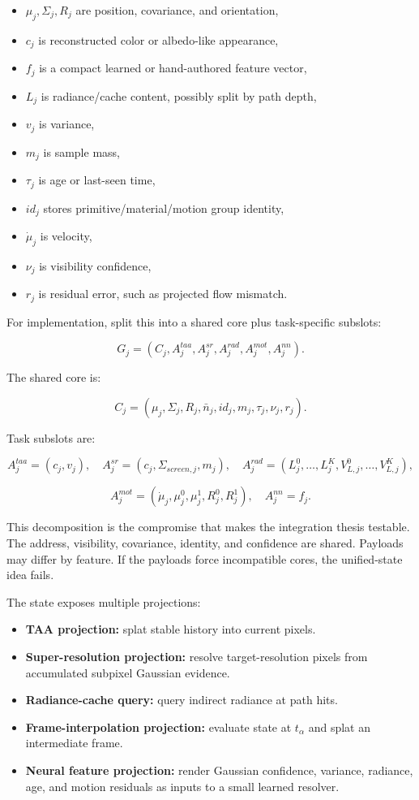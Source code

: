 \documentclass[11pt]{article}
\begin{document}
\begin{itemize}
  \item $\mu_j, \Sigma_j, R_j$ are position, covariance, and orientation,
  \item $c_j$ is reconstructed color or albedo-like appearance,
  \item $f_j$ is a compact learned or hand-authored feature vector,
  \item $L_j$ is radiance/cache content, possibly split by path depth,
  \item $v_j$ is variance,
  \item $m_j$ is sample mass,
  \item $\tau_j$ is age or last-seen time,
  \item $id_j$ stores primitive/material/motion group identity,
  \item $\dot{\mu}_j$ is velocity,
  \item $\nu_j$ is visibility confidence,
  \item $r_j$ is residual error, such as projected flow mismatch.
\end{itemize}

For implementation, split this into a shared core plus task-specific subslots:

\[
  G_j = (C_j, A_j^{taa}, A_j^{sr}, A_j^{rad}, A_j^{mot}, A_j^{nn}).
\]

The shared core is:

\[
  C_j = (\mu_j,\Sigma_j,R_j,\bar{n}_j,id_j,m_j,\tau_j,\nu_j,r_j).
\]

Task subslots are:

\[
  A_j^{taa}=(c_j,v_j),\quad
  A_j^{sr}=(c_j,\Sigma_{screen,j},m_j),\quad
  A_j^{rad}=(L_j^0,\ldots,L_j^K,V_{L,j}^0,\ldots,V_{L,j}^K),
\]

\[
  A_j^{mot}=(\dot{\mu}_j,\mu_j^0,\mu_j^1,R_j^0,R_j^1),
  \quad
  A_j^{nn}=f_j.
\]

This decomposition is the compromise that makes the integration thesis
testable. The address, visibility, covariance, identity, and confidence are
shared. Payloads may differ by feature. If the payloads force incompatible
cores, the unified-state idea fails.

The state exposes multiple projections:

\begin{itemize}
  \item \textbf{TAA projection:} splat stable history into current pixels.
  \item \textbf{Super-resolution projection:} resolve target-resolution pixels
        from accumulated subpixel Gaussian evidence.
  \item \textbf{Radiance-cache query:} query indirect radiance at path hits.
  \item \textbf{Frame-interpolation projection:} evaluate state at $t_\alpha$
        and splat an intermediate frame.
  \item \textbf{Neural feature projection:} render Gaussian confidence,
        variance, radiance, age, and motion residuals as inputs to a small
        learned resolver.
\end{itemize}
\end{document}
